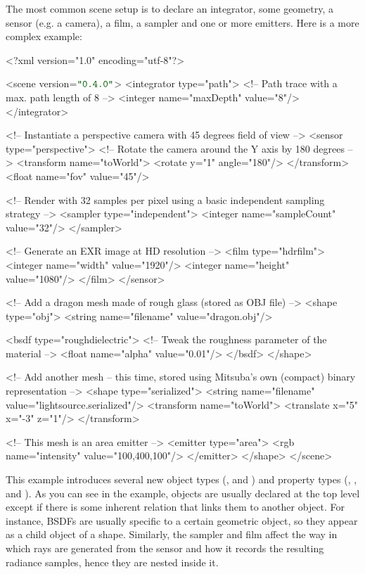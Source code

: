 The most common scene setup is to declare an integrator, some geometry, a sensor (e.g. a camera), a film, a sampler  
and one or more emitters. Here is a more complex example:
\begin{xml}
<?xml version="1.0" encoding="utf-8"?>

<scene version=$\MtsVer$>
	<integrator type="path">
		<!-- Path trace with a max. path length of 8 -->
		<integer name="maxDepth" value="8"/>
	</integrator>

	<!-- Instantiate a perspective camera with 45 degrees field of view -->
	<sensor type="perspective">
		<!-- Rotate the camera around the Y axis by 180 degrees -->
		<transform name="toWorld">
			<rotate y="1" angle="180"/>
		</transform>
		<float name="fov" value="45"/>

		<!-- Render with 32 samples per pixel using a basic
             independent sampling strategy -->
		<sampler type="independent">
			<integer name="sampleCount" value="32"/>
		</sampler>

		<!-- Generate an EXR image at HD resolution -->
		<film type="hdrfilm">
			<integer name="width" value="1920"/>
			<integer name="height" value="1080"/>
		</film>
	</sensor>

	<!-- Add a dragon mesh made of rough glass (stored as OBJ file) -->
	<shape type="obj">
		<string name="filename" value="dragon.obj"/>

		<bsdf type="roughdielectric">
			<!-- Tweak the roughness parameter of the material -->
			<float name="alpha" value="0.01"/>
		</bsdf>
	</shape>

	<!-- Add another mesh -- this time, stored using Mitsuba's own
	     (compact) binary representation -->
	<shape type="serialized">
		<string name="filename" value="lightsource.serialized"/>
		<transform name="toWorld">
			<translate x="5" x="-3" z="1"/>
		</transform>

		<!-- This mesh is an area emitter -->
		<emitter type="area">
			<rgb name="intensity" value="100,400,100"/>
		</emitter>
	</shape>
</scene>
\end{xml}
This example introduces several new object types (, and )
and property types (, , and ). 
As you can see in the example, objects are usually declared at the top level except if there is some
inherent relation that links them to another object. For instance, BSDFs are usually specific to a certain geometric object, so 
they appear as a child object of a shape. Similarly, the sampler and film affect the way in which
rays are generated from the sensor and how it records the resulting radiance samples, hence they are nested inside it.

